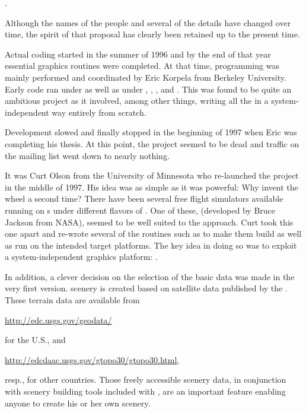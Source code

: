 .
 \medskip

\noindent
 Although the names of the people and several of the details have changed over time,
the spirit of that proposal has clearly been retained up to the present time.

Actual coding started in the summer of 1996 and by the end of that year essential
graphics routines were completed. At that time, programming was mainly performed and
coordinated by Eric Korpela from Berkeley University. Early code ran
under  as well as under , , ,
and . This was found to be quite an ambitious project as it involved, among
other things, writing all the  in a system-independent way
entirely from scratch.

Development slowed and finally stopped in the beginning of 1997 when Eric was completing
his thesis. At this point, the project seemed to be dead and traffic on the mailing list
went down to nearly nothing.

It was Curt Olson from the University of Minnesota who re-launched the
project in the middle of 1997. His idea was as simple as it was powerful: Why invent the
wheel a second time? There have been several free flight simulators available running on s under different flavors of
. One of these,  (developed by Bruce Jackson from NASA), seemed to be well suited to the approach. Curt took this one apart and
re-wrote several of the routines such as to make them build as well as run on the
intended target platforms. The key idea in doing so was to exploit a system-independent
graphics platform: .

In addition, a clever decision on the selection of the basic 
data was made in the very first version. \FlightGear{} scenery is created
based on satellite data published by the .
These terrain data are available from
 \medskip

 \href{http://edc.usgs.gov/geodata/}{http://edc.usgs.gov/geodata/}
 \medskip

\noindent
 for the U.S., and
  \medskip

 \href{http://edcdaac.usgs.gov/gtopo30/gtopo30.html}{http://edcdaac.usgs.gov/gtopo30/gtopo30.html},
  \medskip

\noindent
 resp., for other countries. Those freely accessible scenery data, in
 conjunction with scenery building tools included with
 \FlightGear{}$\!$, are an important feature enabling anyone to
  create his or her own scenery.

